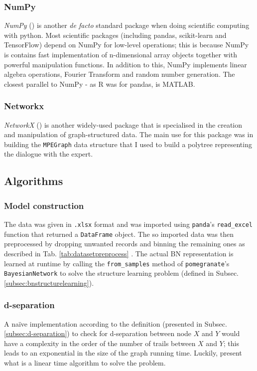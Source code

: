 \subsubsection{NumPy}
\textit{NumPy} (\cite{numpy}) is another \textit{de facto} standard package when doing scientific computing with python.
Most scientific packages (including pandas, scikit-learn and TensorFlow) depend on NumPy for low-level operations; this is because NumPy is contains fast implementation of n-dimensional array objects together with powerful manipulation functions.
In addition to this, NumPy implements linear algebra operations, Fourier Transform and random number generation.
The closest parallel to NumPy - as R was for pandas, is MATLAB.

\subsubsection{Networkx}
\textit{NetworkX} (\cite{networkx}) is another widely-used package that is specialised in the creation and manipulation of graph-structured data.
The main use for this package was in building the \texttt{MPEGraph} data structure that I used to build a polytree representing the dialogue with the expert.

\subsection{Algorithms} 

\subsubsection{Model construction}
The data was given in \texttt{.xlsx} format and was imported using \texttt{panda}'s \texttt{read\_excel} function that returned a \texttt{DataFrame} object.
The so imported data was then preprocessed by dropping unwanted records and binning the remaining ones as described in Tab. \ref{tab:datasetpreprocess} .
The actual BN representation is learned at runtime by calling the \texttt{from\_samples} method of \texttt{pomegranate}'s \texttt{BayesianNetwork} to solve the structure learning problem (defined in Subsec. \ref{subsec:bnstructurelearning}).

\subsubsection{d-separation}
A na{\"i}ve implementation according to the definition (presented in Subsec. \ref{subsec:d-separation}) to check for d-separation between node $X$ and $Y$ would have a complexity in the order of the number of trails between $X$ and $Y$; this leads to an exponential in the size of the graph running time.
Luckily, \cite{koller2007dseparation} present what is a linear time algorithm to solve the problem.


